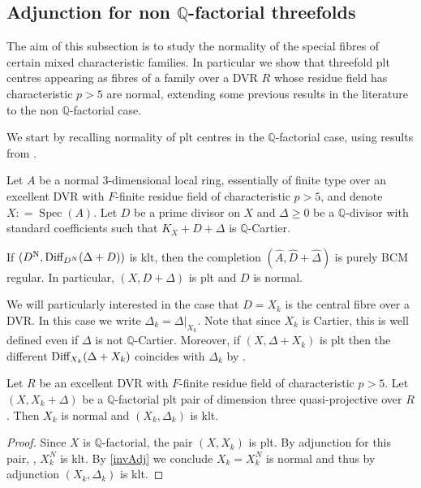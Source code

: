 \documentclass[a4paper,12pt]{book}
\DeclareMathOperator{\Spec}{Spec}
\newcommand{\bQ}{\mathbb{Q}}
\begin{document}
	\subsection{Adjunction for non $\mathbb{Q}$-factorial threefolds}
	The aim of this subsection is to study the normality of the special fibres of certain mixed characteristic families. In particular we show that threefold plt centres appearing as fibres of a family over a DVR $R$ whose residue field has characteristic $p>5$ are normal, extending some previous results in the literature to the non $\mathbb{Q}$-factorial case. 
	
	We start by recalling normality of plt centres in the $\mathbb{Q}$-factorial case, using results from \cite{ma2019analog}.
	\begin{theorem}{\cite[Theorem G]{ma2019analog}}\label{invAdj}
		Let $A$ be a normal 3-dimensional local ring, essentially of finite type over an excellent DVR with $F$-finite residue field of characteristic $p > 5$, and denote $X: = \Spec (A)$.
		Let $D$ be a prime divisor on $X$ and $\Delta \geq 0$ be a $\bQ$-divisor with standard coefficients such that $K_X + D + \Delta$ is $\bQ$-Cartier.  
		
		If $(D^{\mathrm{N}}, \textup{Diff}_{D^N}(\Delta+D))$ is klt, then the completion $(\widehat{A}, \widehat{D}+\widehat{\Delta})$ is purely BCM regular. In particular, $(X, D+\Delta)$ is plt and $D$ is normal.	
	\end{theorem}
	
	We will particularly interested in the case that $D=X_{k}$ is the central fibre over a DVR. 
	In this case we write $\Delta_{k}=\Delta|_{X_k}$. Note that since $X_{k}$ is Cartier, this is well defined even if $\Delta$ is not $\mathbb{Q}$-Cartier.
	Moreover, if $(X,\Delta+X_{k})$ is plt then the different $\textup{Diff}_{X_k}(\Delta+X_k)$ coincides with $\Delta_{k}$ by \cite[Proposition 4.5]{kk-singbook}.
	
	\begin{corollary}\label{normality}
		Let $R$ be an excellent DVR with $F$-finite residue field of characteristic $p>5$. Let $(X,X_{k}+\Delta)$ be a $\mathbb{Q}$-factorial plt pair of dimension three quasi-projective over $R$. 
		Then $X_{k}$ is normal and $(X_k, \Delta_k)$ is klt.
	\end{corollary}
	\begin{proof}
		Since $X$ is $\mathbb{Q}$-factorial, the pair $(X, X_k)$ is plt.
			By adjunction for this pair, \cite[Lemma 4.8]{kk-singbook}, $X^{N}_{k}$ is klt.  
		By \autoref{invAdj} we conclude $X_{k}=X^{N}_{k}$ is normal and thus by adjunction $(X_k, \Delta_k)$ is klt.
	\end{proof}
	
\end{document}
